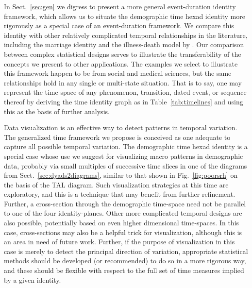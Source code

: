 \documentclass[12pt,oneside,a4paper]{article} %
\theoremstyle{definition}
\begin{document}
In Sect.~\ref{sec:gen} we digress to present a more general event-duration identity framework, which allows us to situate the demographic time hexad identity more
rigorously as a special case of an event-duration framework. We compare this
identity with other relatively complicated temporal relationships in the literature, including the \citet{lexis1875einleitung}
marriage identity and the illness-death model by \citet{brinks2014lexis}. Our comparison between complex statistical designs serves to illustrate the
transferability of the concepts we present to other applications. The
examples we select to illustrate this framework happen to be from social and
medical sciences, but the same relationships hold in any single or multi-state
situation. That is to say, one may represent the time-space of any phenomenon,
transition, dated event, or sequence thereof by deriving the time identity graph
as in Table~\ref{tab:timelines} and using this as the basis of further
analysis. 

Data visualization is an effective way to detect patterns in temporal variation. The generalized time framework we propose is conceived as one
adequate to capture all possible temporal variation. The demographic time hexad identity is a special case whose use we suggest for
visualizing macro patterns in demographic data, probably via small multiples of
successive time slices in one of the diagrams from Sect.~\ref{sec:dyads2diagrams}, similar to that shown in Fig.~\ref{fig:poorsrh} on the basis of the TAL diagram.
Such visualization strategies at this time are exploratory, and this is a
technique that may benefit from further refinement. Further, a cross-section
through the demographic time-space need not be parallel to one of the four
identity-planes. Other more complicated temporal designs are also possible,
potentially based on even higher dimensional time-spaces. In this case,
cross-sections may also be a helpful trick for visualization, although this is
an area in need of future work. Further, if the purpose of visualization in
this case is merely to detect the principal direction of variation, appropriate
statistical methods should be developed (or recommended) to do so in a more
rigorous way, and these should be flexible with respect to the full set of time measures implied by a given
identity.
\end{document}

